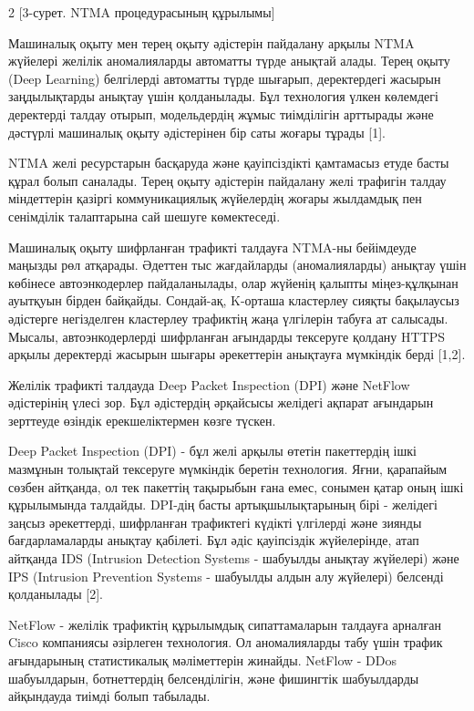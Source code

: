 \begin{multicols}{2}
[3-сурет. NTMA процедурасының құрылымы]

Машиналық оқыту мен терең оқыту әдістерін пайдалану арқылы NTMA жүйелері
желілік аномалияларды автоматты түрде анықтай алады. Терең оқыту (Deep
Learning) белгілерді автоматты түрде шығарып, деректердегі жасырын
заңдылықтарды анықтау үшін қолданылады. Бұл технология үлкен көлемдегі
деректерді талдау отырып, модельдердің жұмыс тиімділігін арттырады және
дәстүрлі машиналық оқыту әдістерінен бір саты жоғары тұрады {[}1{]}.

NTMA желі ресурстарын басқаруда және қауіпсіздікті қамтамасыз етуде
басты құрал болып саналады. Терең оқыту әдістерін пайдалану желі
трафигін талдау міндеттерін қазіргі коммуникациялық жүйелердің жоғары
жылдамдық пен сенімділік талаптарына сай шешуге көмектеседі.

Машиналық оқыту шифрланған трафикті талдауға NTMA-ны бейімдеуде маңызды
рөл атқарады. Әдеттен тыс жағдайларды (аномалияларды) анықтау үшін
көбінесе автоэнкодерлер пайдаланылады, олар жүйенің қалыпты
міңез-құлқынан ауытқуын бірден байқайды. Сондай-ақ, K-орташа кластерлеу
сияқты бақылаусыз әдістерге негізделген кластерлеу трафиктің жаңа
үлгілерін табуға ат салысады. Мысалы, автоэнкодерлерді шифрланған
ағындарды тексеруге қолдану HTTPS арқылы деректерді жасырын шығары
әрекеттерін анықтауға мүмкіндік берді {[}1,2{]}.

Желілік трафикті талдауда Deep Packet Inspection (DPI) және NetFlow
әдістерінің үлесі зор. Бұл әдістердің әрқайсысы желідегі ақпарат
ағындарын зерттеуде өзіндік ерекшеліктермен көзге түскен.

Deep Packet Inspection (DPI) - бұл желі арқылы өтетін пакеттердің ішкі
мазмұнын толықтай тексеруге мүмкіндік беретін технология. Яғни,
қарапайым сөзбен айтқанда, ол тек пакеттің тақырыбын ғана емес, сонымен
қатар оның ішкі құрылымында талдайды. DPI-дің басты артықшылықтарының
бірі - желідегі заңсыз әрекеттерді, шифрланған трафиктегі күдікті
үлгілерді және зиянды бағдарламаларды анықтау қабілеті. Бұл әдіс
қауіпсіздік жүйелерінде, атап айтқанда IDS (Intrusion Detection Systems
- шабуылды анықтау жүйелері) және IPS (Intrusion Prevention Systems -
шабуылды алдын алу жүйелері) белсенді қолданылады {[}2{]}.

NetFlow - желілік трафиктің құрылымдық сипаттамаларын талдауға арналған
Cisco компаниясы әзірлеген технология. Ол аномалияларды табу үшін трафик
ағындарының статистикалық мәліметтерін жинайды. NetFlow - DDos
шабуылдарын, ботнеттердің белсенділігін, және фишингтік шабуылдарды
айқындауда тиімді болып табылады.


\end{multicols}
